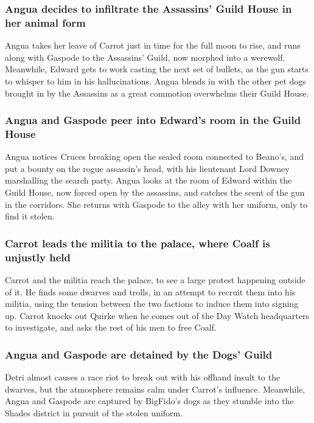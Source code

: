 \subsubsection{\Gls{Angua} decides to infiltrate the Assassins' Guild House in her animal form}
\Gls{Angua} takes her leave of \Gls{Carrot} just in time for the full moon to rise, and runs along
with \Gls{Gaspode} to the Assassins' Guild, now morphed into a werewolf. Meanwhile, \Gls{Edward}
gets to work casting the next set of bullets, as the gun starts to whisper to him in his
hallucinations. \Gls{Angua} blends in with the other pet dogs brought in by the Assassins as a
great commotion overwhelms their Guild House.

\subsubsection{\Gls{Angua} and \Gls{Gaspode} peer into \Gls{Edward}'s room in the Guild House}
\Gls{Angua} notices \Gls{Cruces} breaking open the sealed room connected to \Gls{Beano}'s, and
put a bounty on the rogue assassin's head, with his lieutenant Lord \Gls{Downey} marshalling the
search party. \Gls{Angua} looks at the room of \Gls{Edward} within the Guild House, now forced
open by the assassins, and catches the scent of the gun in the corridors. She returns with
\Gls{Gaspode} to the alley with her uniform, only to find it stolen.

\subsubsection{\Gls{Carrot} leads the militia to the palace, where \Gls{Coalf} is unjustly held}
\Gls{Carrot} and the militia reach the palace, to see a large protest happening outside of it. He
finds some dwarves and trolls, in an attempt to recruit them into his militia, using the tension
between the two factions to induce them into signing up. \Gls{Carrot} knocks out \Gls{Quirke} when
he comes out of the Day Watch headquarters to investigate, and asks the rest of his men to free
\Gls{Coalf}.

\subsubsection{\Gls{Angua} and \Gls{Gaspode} are detained by the Dogs' Guild}
\Gls{Detri} almost causes a race riot to break out with his offhand insult to the dwarves, but
the atmosphere remains calm under \Gls{Carrot}'s influence. Meanwhile, \Gls{Angua} and \Gls{Gaspode}
are captured by \Gls{BigFido}'s dogs as they stumble into the Shades district in pursuit of the
stolen uniform.

